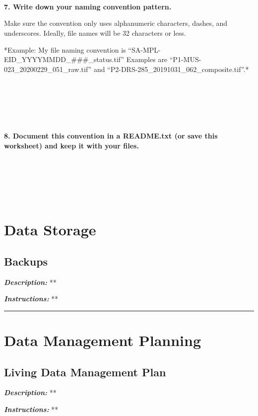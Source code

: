 \documentclass[
]{book}
\begin{document}
~

~

~

\textbf{7. Write down your naming convention pattern.}

Make sure the convention only uses alphanumeric characters, dashes, and underscores. Ideally, file names will be 32 characters or less.

*Example: My file naming convention is ``SA-MPL-EID\_YYYYMMDD\_\#\#\#\_status.tif'' Examples are ``P1-MUS-023\_20200229\_051\_raw.tif'' and ``P2-DRS-285\_20191031\_062\_composite.tif''.*

~

~

~

\textbf{8. Document this convention in a README.txt (or save this worksheet) and keep it with your files.}

~

~

~

\hypertarget{data-storage}{%
\chapter{Data Storage}\label{data-storage}}

\hypertarget{backups}{%
\section{Backups}\label{backups}}

\textbf{\emph{Description:}} **

\textbf{\emph{Instructions:}} **

\begin{center}\rule{0.5\linewidth}{0.5pt}\end{center}

\hypertarget{data-management-planning}{%
\chapter{Data Management Planning}\label{data-management-planning}}

\hypertarget{living-dmp}{%
\section{Living Data Management Plan}\label{living-dmp}}

\textbf{\emph{Description:}} **

\textbf{\emph{Instructions:}} **
\end{document}
